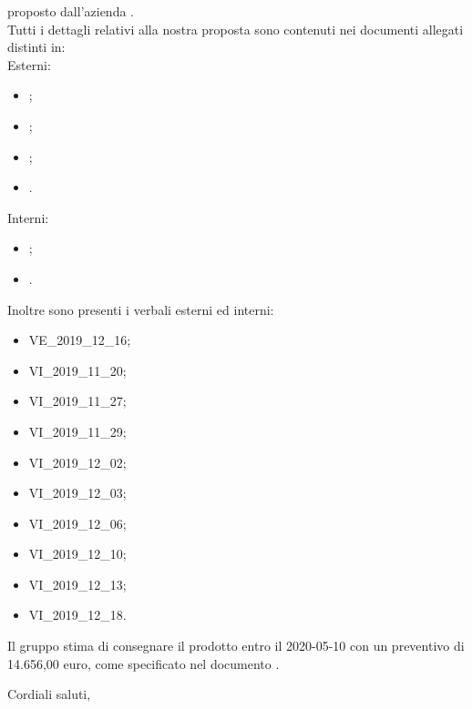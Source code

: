 \documentclass[12pt]{letter}
\begin{document}
\begin{letter}
\begin{center}
        \end{center}
        proposto dall'azienda \textbf{\Proponente{}}.\\
        Tutti i dettagli relativi alla nostra proposta sono contenuti nei documenti allegati distinti in: \\
        Esterni: 
        \begin{itemize}
            \item {};
            \item {};
            \item {};
            \item {}.
        \end{itemize}
        Interni:
        \begin{itemize}
            \item {};
            \item {}.
        \end{itemize}
        Inoltre sono presenti i verbali esterni ed interni:
        \begin{itemize}
            \item VE\_2019\_12\_16;
            \item VI\_2019\_11\_20;
            \item VI\_2019\_11\_27;
            \item VI\_2019\_11\_29;
            \item VI\_2019\_12\_02;
            \item VI\_2019\_12\_03;
            \item VI\_2019\_12\_06;
            \item VI\_2019\_12\_10;
            \item VI\_2019\_12\_13;
            \item VI\_2019\_12\_18.
        \end{itemize}
        Il gruppo stima di consegnare il prodotto entro il 2020-05-10 con un preventivo di 14.656,00 euro, come specificato nel documento .
        \closing{Cordiali saluti,}
        \vspace{10mm}
    \end{letter}
\end{document}
